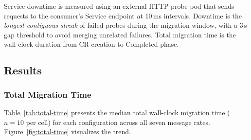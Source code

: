 \documentclass[conference]{IEEEtran}
\begin{document}
Service downtime is measured using an external HTTP probe pod that sends
requests to the consumer's Service endpoint at 10\,ms intervals. Downtime is
the \textit{longest contiguous streak} of failed probes during the migration
window, with a 3\,s gap threshold to avoid merging unrelated failures. Total
migration time is the wall-clock duration from CR creation to Completed phase.

\subsection{Results}
\label{sec:results}

\subsubsection{Total Migration Time}

Table~\ref{tab:total-time} presents the median total wall-clock migration time
($n=10$ per cell) for each configuration across all seven message rates.
Figure~\ref{fig:total-time} visualizes the trend.
\end{document}
